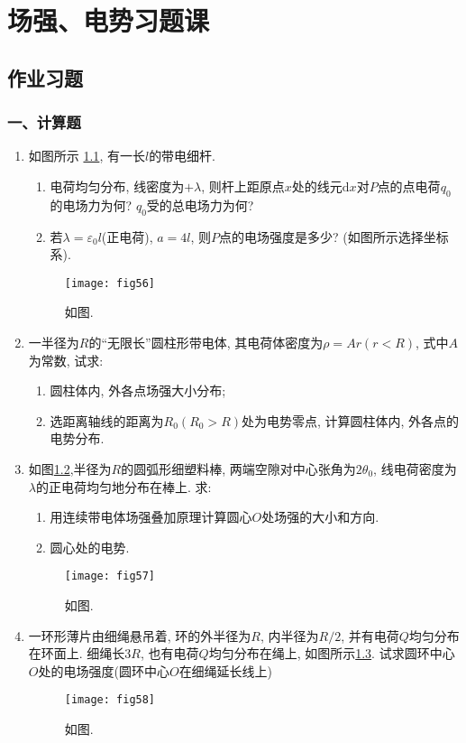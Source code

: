 \chapter{场强、电势习题课}
\section{作业习题}
\subsection*{一、计算题}
\begin{enumerate}
    \item 如图所示 \ref{fig:56}, 有一长$l$的带电细杆.
    \begin{enumerate}
        \item[(1)] 电荷均匀分布, 线密度为$+\lambda$, 则杆上距原点$x$处的线元$\mathrm{d}x$对$P$点的点电荷$q_0$的电场力为何? $q_0$受的总电场力为何?
        \item[(2)] 若$\lambda=\varepsilon_0 l$(正电荷), $a=4l$, 则$P$点的电场强度是多少? (如图所示选择坐标系).
        
    \end{enumerate}
    \begin{figure}[H]
        \centering
        \texttt{[image: fig56]}
        \caption{如图.}\label{fig:56}
    \end{figure}
    \item 一半径为$R$的“无限长”圆柱形带电体, 其电荷体密度为$\rho=Ar(r<R)$, 式中$A$为常数, 试求:
    \begin{enumerate}
        \item 圆柱体内, 外各点场强大小分布;
        \item 选距离轴线的距离为$R_0(R_0>R)$处为电势零点, 计算圆柱体内, 外各点的电势分布.
    \end{enumerate}
    \item 如图\ref{fig:57},半径为$R$的圆弧形细塑料棒, 两端空隙对中心张角为$2\theta_0$, 线电荷密度为$\lambda$的正电荷均匀地分布在棒上. 求:
    \begin{enumerate}
        \item 用连续带电体场强叠加原理计算圆心$O$处场强的大小和方向.
        \item 圆心处的电势.
    \end{enumerate}
    \begin{figure}[H]
        \centering
        \texttt{[image: fig57]}
        \caption{如图.}\label{fig:57}
    \end{figure}
    \item  一环形薄片由细绳悬吊着, 环的外半径为$R$, 内半径为$R/2$, 并有电荷$Q$均匀分布在环面上. 细绳长$3R$, 也有电荷$Q$均匀分布在绳上, 如图所示\ref{fig:58}. 试求圆环中心$O$处的电场强度(圆环中心$O$在细绳延长线上)
    \begin{figure}[H]
        \centering
        \texttt{[image: fig58]}
        \caption{如图.}\label{fig:58}
    \end{figure}
\end{enumerate}